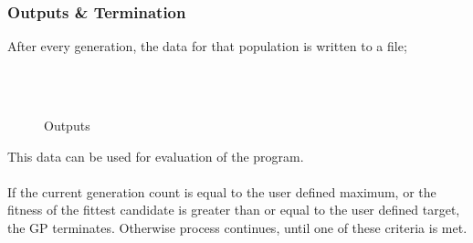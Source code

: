 \documentclass{beamer}
\begin{document}
\begin{frame}
\frametitle{Outputs \& Termination}
After every generation, the data for that population is written to a file;
\begin{figure}[H]
\caption{Outputs}
\\~\\
\end{figure}
This data can be used for evaluation of the program.\\~\\
If the current generation count is equal to the user defined maximum, or the fitness of the fittest candidate is greater than or equal to the user defined target, the GP terminates. Otherwise process continues, until one of these criteria is met.
\end{frame}
\end{document}

